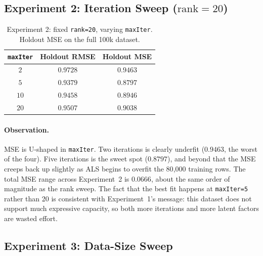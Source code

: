 \documentclass[12pt]{article}
\begin{document}
	\subsection{\texorpdfstring{Experiment 2: Iteration Sweep ($\text{rank}=20$)}{Experiment 2: Iteration Sweep (rank=20)}}\label{sec:exp2}

	\begin{table}[H]
		\centering
		\caption{Experiment 2: fixed \texttt{rank=20}, varying \texttt{maxIter}. Holdout MSE on the full 100k dataset.}\label{tab:exp2}
		\begin{tabular}{ccc}
			\toprule
			\texttt{maxIter} & Holdout RMSE & Holdout MSE \\
			\midrule
			$2$  & $0.9728$ & $0.9463$ \\
			$5$  & $0.9379$ & $\mathbf{0.8797}$ \\
			$10$ & $0.9458$ & $0.8946$ \\
			$20$ & $0.9507$ & $0.9038$ \\
			\bottomrule
		\end{tabular}
	\end{table}

	\paragraph{Observation.} MSE is U-shaped in \texttt{maxIter}. Two iterations is clearly underfit ($0.9463$, the worst of the four). Five iterations is the sweet spot ($0.8797$), and beyond that the MSE creeps back up slightly as ALS begins to overfit the 80{,}000 training rows. The total MSE range across Experiment~2 is $0.0666$, about the same order of magnitude as the rank sweep. The fact that the best fit happens at \texttt{maxIter=5} rather than 20 is consistent with Experiment~1's message: this dataset does not support much expressive capacity, so both more iterations and more latent factors are wasted effort.

	\subsection{Experiment 3: Data-Size Sweep}\label{sec:exp3}
\end{document}
